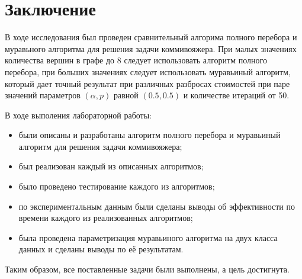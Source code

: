 \chapter*{Заключение}

В ходе исследования был проведен сравнительный алгорима полного перебора и 
муравьного алгоритма для решения задачи коммивояжера. При малых значениях
количества вершин в графе до 8 следует использовать алгоритм полного перебора,
при больших значениях следует использовать муравьиный алгоритм, который дает
точный результат при различных разбросах стоимостей  при паре значений
параметров $(\alpha, p)$ равной $(0.5, 0.5)$ и количестве итераций от 50.

В ходе выполения лабораторной работы:
\begin{itemize}[left=\parindent]
    \item были описаны и разработаны алгоритм полного перебора и муравьиный
        алгоритм для решения задачи коммивояжера;
    \item был реализован каждый из описанных алгоритмов;
    \item было проведено тестирование каждого из алгоритмов;
    \item по экспериментальным данным были сделаны выводы об эффективности по
          времени каждого из реализованных алгоритмов;
    \item была проведена параметризация муравьиного алгоритма на двух класса
        данных и сделаны выводы по её результатам.
\end{itemize}

Таким образом, все поставленные задачи были выполнены, а цель достигнута.
